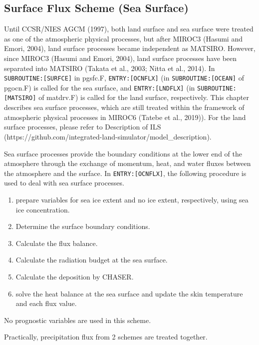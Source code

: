 \hypertarget{surface-flux-scheme-sea-surface}{%
\subsection{Surface Flux Scheme (Sea
Surface)}\label{surface-flux-scheme-sea-surface}}

Until CCSR/NIES AGCM (1997), both land surface and sea surface were
treated as one of the atmospheric physical processes, but after MIROC3
(Hasumi and Emori, 2004), land surface processes became independent as
MATSIRO. However, since MIROC3 (Hasumi and Emori, 2004), land surface
processes have been separated into MATSIRO (Takata et al., 2003; Nitta
et al., 2014). In \texttt{SUBROUTINE:{[}SURFCE{]}} in pgsfc.F,
\texttt{ENTRY:{[}OCNFLX{]}} (in \texttt{SUBROUTINE:{[}OCEAN{]}} of
pgocn.F) is called for the sea surface, and \texttt{ENTRY:{[}LNDFLX{]}}
(in \texttt{SUBROUTINE:{[}MATSIRO{]}} of matdrv.F) is called for the
land surface, respectively. This chapter describes sea surface
processes, which are still treated within the framework of atmospheric
physical processes in MIROC6 (Tatebe et al., 2019)). For the land
surface processes, please refer to Description of ILS
(https://github.com/integrated-land-simulator/model\_description).

Sea surface processes provide the boundary conditions at the lower end
of the atmosphere through the exchange of momentum, heat, and water
fluxes between the atmosphere and the surface. In
\texttt{ENTRY:{[}OCNFLX{]}}, the following procedure is used to deal
with sea surface processes.

\begin{enumerate}
\def\labelenumi{\arabic{enumi}.}
\tightlist
\item
  prepare variables for sea ice extent and no ice extent, respectively,
  using sea ice concentration.
\item
  Determine the surface boundary conditions.
\item
  Calculate the flux balance.
\item
  Calculate the radiation budget at the sea surface.
\item
  Calculate the deposition by CHASER.
\item
  solve the heat balance at the sea surface and update the skin
  temperature and each flux value.
\end{enumerate}

No prognostic variables are used in this scheme.

Practically, precipitation flux from 2 schemes are treated together.

